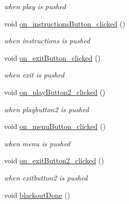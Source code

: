 \begin{DoxyCompactItemize}
\begin{DoxyCompactList}\small\item\em when play is pushed \end{DoxyCompactList}\item 
\hypertarget{class_dialog_a25f811678b39e8375ea5bc0df6063a9a}{void \hyperlink{class_dialog_a25f811678b39e8375ea5bc0df6063a9a}{on\-\_\-instructions\-Button\-\_\-clicked} ()}\label{class_dialog_a25f811678b39e8375ea5bc0df6063a9a}

\begin{DoxyCompactList}\small\item\em when instructions is pushed \end{DoxyCompactList}\item 
\hypertarget{class_dialog_a27969c9386dbad7fc98adb235c143e7b}{void \hyperlink{class_dialog_a27969c9386dbad7fc98adb235c143e7b}{on\-\_\-exit\-Button\-\_\-clicked} ()}\label{class_dialog_a27969c9386dbad7fc98adb235c143e7b}

\begin{DoxyCompactList}\small\item\em when exit is pushed \end{DoxyCompactList}\item 
\hypertarget{class_dialog_a5e6ec65f6732629ca8a8433fd182e73a}{void \hyperlink{class_dialog_a5e6ec65f6732629ca8a8433fd182e73a}{on\-\_\-play\-Button2\-\_\-clicked} ()}\label{class_dialog_a5e6ec65f6732629ca8a8433fd182e73a}

\begin{DoxyCompactList}\small\item\em when playbutton2 is pushed \end{DoxyCompactList}\item 
\hypertarget{class_dialog_ac2a85847a1a1d608d9736a65e4a58406}{void \hyperlink{class_dialog_ac2a85847a1a1d608d9736a65e4a58406}{on\-\_\-menu\-Button\-\_\-clicked} ()}\label{class_dialog_ac2a85847a1a1d608d9736a65e4a58406}

\begin{DoxyCompactList}\small\item\em when menu is pushed \end{DoxyCompactList}\item 
\hypertarget{class_dialog_a485961309d5073b5affe91419f9848ef}{void \hyperlink{class_dialog_a485961309d5073b5affe91419f9848ef}{on\-\_\-exit\-Button2\-\_\-clicked} ()}\label{class_dialog_a485961309d5073b5affe91419f9848ef}

\begin{DoxyCompactList}\small\item\em when exitbutton2 is pushed \end{DoxyCompactList}\item 
\hypertarget{class_dialog_aba2e6cbe0699f726c2cd3415c20684ee}{void \hyperlink{class_dialog_aba2e6cbe0699f726c2cd3415c20684ee}{blackout\-Done} ()}\label{class_dialog_aba2e6cbe0699f726c2cd3415c20684ee}


\end{DoxyCompactItemize}
